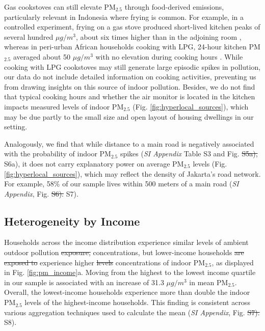 \documentclass[9pt,twocolumn,twoside]{pnas-new}
\providecommand{\DIFadd}[1]{{\protect\color{red}#1}}
\providecommand{\DIFdel}[1]{{\protect\color{red}\protect\sout{#1}}}
\begin{document}
\DIFadd{Gas cookstoves can still elevate PM$_{2.5}$ through food-derived emissions, particularly relevant in Indonesia where frying is common. For example, in a controlled experiment, frying on a gas stove produced short-lived kitchen peaks of several hundred $\mu g/m^3$, about six times higher than in the adjoining room \citep{Huboyo2011}, whereas in peri-urban African households cooking with LPG, 24-hour kitchen PM$_{2.5}$ averaged about 50 $\mu g/m^3$ with no elevation during cooking hours \citep{Shupler2024}.}
While cooking with LPG cookstoves may still generate large episodic spikes in pollution, our data do not include detailed information on cooking activities, preventing us from drawing insights on this source of indoor pollution. Besides, we do not find that typical cooking hours and whether the air monitor is located in the kitchen impacts measured levels of indoor PM$_{2.5}$ (Fig. \ref{fig:hyperlocal_sources}), which may be due partly to the small size and open layout of housing dwellings in our setting. 

Analogously, we find that while distance to a main road is negatively associated with the probability of indoor PM$_{2.5}$ spikes (\textit{SI Appendix} Table S3 and Fig. \DIFdel{S5a),} \DIFadd{S6a),} it does not carry explanatory power on average PM$_{2.5}$ levels (Fig. \ref{fig:hyperlocal_sources}), which may reflect the density of Jakarta’s road network. For example, 58\% of our sample lives within 500 meters of a main road (\textit{SI Appendix}, Fig. \DIFdel{S6).} \DIFadd{S7).}

\subsection{Heterogeneity by Income}

Households across the income distribution experience similar levels of ambient outdoor pollution \DIFdel{exposure,} \DIFadd{concentrations,} but lower-income households \DIFdel{are exposed to} \DIFadd{experience} higher \DIFdel{levels} \DIFadd{concentrations} of indoor PM$_{2.5}$, as displayed in Fig. \ref{fig:pm_income}a. Moving from the highest to the lowest income quartile in our sample is associated with an increase of 31.3 $\mu g/m^3$ in mean PM$_{2.5}$. Overall, the lowest-income households experience more than double the indoor PM$_{2.5}$ levels of the highest-income households. This finding is consistent across various aggregation techniques used to calculate the mean (\textit{SI Appendix}, Fig. \DIFdel{S7).} \DIFadd{S8).}
\end{document}
